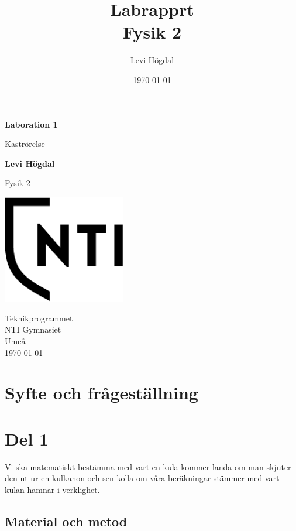 \documentclass[11p]{article}
\title{Labrapprt \\ \small Fysik 2}
\author{Levi Högdal }
\date{\today}
\begin{document}
    \begin{titlepage}
        \begin{center}
            \vspace*{1cm}

            \Huge
            \textbf{Laboration 1}

            \vspace{0.5cm}
            \LARGE
            Kaströrelse

            \vspace{1.5cm}

            \textbf{Levi Högdal}

            \vfill


            Fysik 2

            \vspace{0.8cm}

            \includegraphics[width=0.4\textwidth]{../images/NTI Gymnasiet_Symbol_print_svart.png}

            \Large
            Teknikprogrammet\\
            NTI Gymnasiet\\
            Umeå\\
            \today

        \end{center}
    \end{titlepage}
    \section{Syfte och frågeställning}
    \section{Del 1}
    Vi ska matematiskt bestämma med vart en kula kommer landa om man skjuter den ut ur en kulkanon och sen kolla om våra beräkningar stämmer med vart kulan hamnar i verklighet.
    \subsection{Material och metod}
\end{document}
